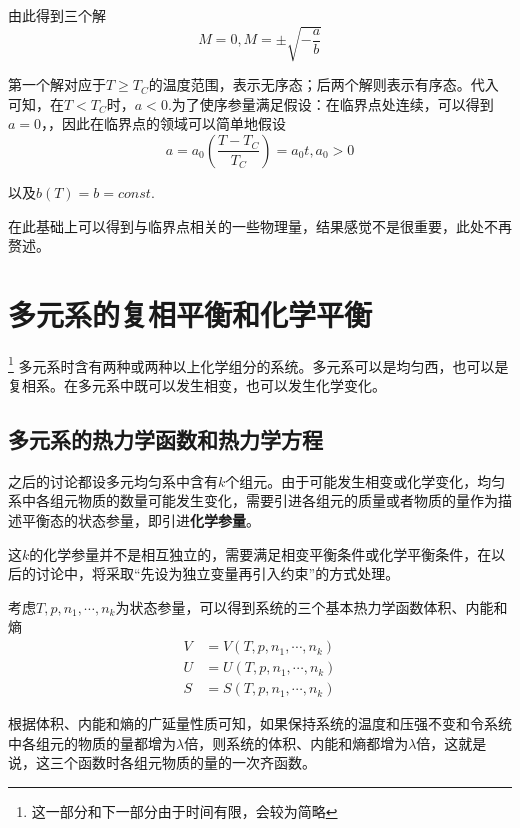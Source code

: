 \documentclass[UTF8]{ctexart}
\begin{document}
\noindent 由此得到三个解
\begin{equation}
M=0, M=\pm \sqrt{-\frac{a}{b}}
\end{equation}

\noindent 第一个解对应于$ T \geq T_{C} $的温度范围，表示无序态；后两个解则表示有序态。代入可知，在$ T<T_{C} $时，$ a<0 $.为了使序参量满足假设：在临界点处连续，可以得到$ a=0 $，，因此在临界点的领域可以简单地假设
\begin{equation}
a=a_{0}\left(\frac{T-T_{C}}{T_{C}}\right)=a_{0} t, a_{0}>0
\end{equation}

\noindent 以及$ b(T) = b = const $.

	在此基础上可以得到与临界点相关的一些物理量，结果感觉不是很重要，此处不再赘述。
	
	\section{多元系的复相平衡和化学平衡}\footnote{这一部分和下一部分由于时间有限，会较为简略}
	多元系时含有两种或两种以上化学组分的系统。多元系可以是均匀西，也可以是复相系。在多元系中既可以发生相变，也可以发生化学变化。
	
	\subsection{多元系的热力学函数和热力学方程}
	之后的讨论都设多元均匀系中含有$ k $个组元。由于可能发生相变或化学变化，均匀系中各组元物质的数量可能发生变化，需要引进各组元的质量或者物质的量作为描述平衡态的状态参量，即引进\textbf{化学参量}。
	
	这$ k $的化学参量并不是相互独立的，需要满足相变平衡条件或化学平衡条件，在以后的讨论中，将采取“先设为独立变量再引入约束”的方式处理。
	
	考虑$ T,p,n_{1},\cdots,n_{k} $为状态参量，可以得到系统的三个基本热力学函数体积、内能和熵
	\begin{equation}
	\begin{aligned} V &=V\left(T, p, n_{1}, \cdots, n_{k}\right) \\ U &=U\left(T, p, n_{1}, \cdots, n_{k}\right) \\ S &=S\left(T, p, n_{1}, \cdots, n_{k}\right) \end{aligned}
	\end{equation}
	
\noindent 根据体积、内能和熵的广延量性质可知，如果保持系统的温度和压强不变和令系统中各组元的物质的量都增为$ \lambda $倍，则系统的体积、内能和熵都增为$ \lambda $倍，这就是说，这三个函数时各组元物质的量的一次齐函数。
\end{document}
